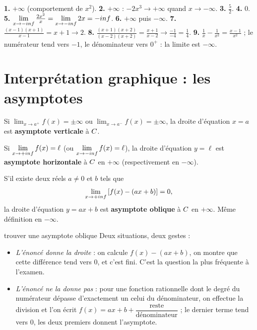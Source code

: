 \begin{corrige}
\textbf{1.} $+\infty$ (comportement de $x^{2}$).
\textbf{2.} $+\infty$ : $-2x^{3} \to +\infty$ quand $x \to -\infty$.
\textbf{3.} $\frac52$.
\textbf{4.} $0$.
\textbf{5.} $\limminf \frac{2x^{2}}{x} = \limminf 2x = -\infty$.
\textbf{6.} $+\infty$ puis $-\infty$.
\textbf{7.} $\frac{(x-1)(x+1)}{x-1} = x+1 \to 2$.
\textbf{8.} $\frac{(x+1)(x+2)}{(x-2)(x+2)} = \frac{x+1}{x-2} \to
\frac{-1}{-4} = \frac14$.
\textbf{9.} $\frac{1}{x}-\frac{1}{x^{2}} = \frac{x-1}{x^{2}}$ ; le
numérateur tend vers $-1$, le dénominateur vers $0^{+}$ : la limite est
$-\infty$.
\end{corrige}

\section{Interprétation graphique : les asymptotes}

\begin{definition}
Si $\displaystyle\lim_{x \to a^{+}} f(x) = \pm\infty$ ou
$\displaystyle\lim_{x \to a^{-}} f(x) = \pm\infty$, la droite d'équation
$x = a$ est \textbf{asymptote verticale} à $C$.
\end{definition}

\begin{definition}
Si $\limpinf f(x) = \ell$ (ou $\limminf f(x) = \ell$), la droite d'équation
$y = \ell$ est \textbf{asymptote horizontale} à $C$ en $+\infty$
(respectivement en $-\infty$).
\end{definition}

\begin{definition}
S'il existe deux réels $a \neq 0$ et $b$ tels que
\[
  \limpinf \left[f(x)-(ax+b)\right] = 0,
\]
la droite d'équation $y = ax+b$ est \textbf{asymptote oblique} à $C$ en
$+\infty$. Même définition en $-\infty$.
\end{definition}

\begin{methode}{trouver une asymptote oblique}
Deux situations, deux gestes :
\begin{itemize}[leftmargin=1.3em, itemsep=0.2em]
  \item \emph{L'énoncé donne la droite} : on calcule
        $f(x)-(ax+b)$, on montre que cette différence tend vers $0$, et
        c'est fini. C'est la question la plus fréquente à l'examen.
  \item \emph{L'énoncé ne la donne pas} : pour une fonction rationnelle dont
        le degré du numérateur dépasse d'exactement un celui du
        dénominateur, on effectue la division et l'on écrit
        $f(x) = ax+b+\dfrac{\text{reste}}{\text{dénominateur}}$ ; le dernier
        terme tend vers $0$, les deux premiers donnent l'asymptote.
\end{itemize}
\end{methode}

